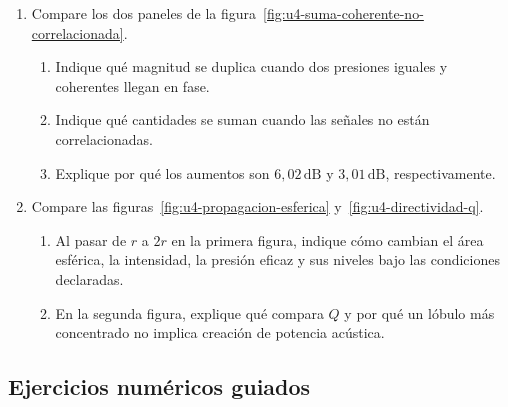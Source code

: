 \begin{enumerate}[label=\textbf{R\arabic*.},leftmargin=*]
    \item Compare los dos paneles de la
    figura~\ref{fig:u4-suma-coherente-no-correlacionada}.
    \begin{enumerate}[label=\alph*)]
        \item Indique qué magnitud se duplica cuando dos presiones iguales y
        coherentes llegan en fase.
        \item Indique qué cantidades se suman cuando las señales no están
        correlacionadas.
        \item Explique por qué los aumentos son \(6{,}02\,\text{dB}\) y
        \(3{,}01\,\text{dB}\), respectivamente.
    \end{enumerate}

    \item Compare las figuras~\ref{fig:u4-propagacion-esferica}
    y~\ref{fig:u4-directividad-q}.
    \begin{enumerate}[label=\alph*)]
        \item Al pasar de \(r\) a \(2r\) en la primera figura, indique cómo
        cambian el área esférica, la intensidad, la presión eficaz y sus
        niveles bajo las condiciones declaradas.
        \item En la segunda figura, explique qué compara \(Q\) y por qué un
        lóbulo más concentrado no implica creación de potencia acústica.
    \end{enumerate}
\end{enumerate}

\subsection*{Ejercicios numéricos guiados}

